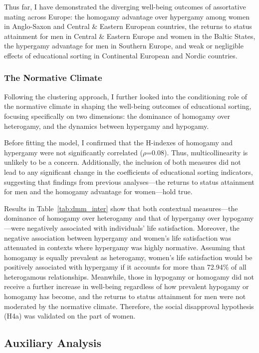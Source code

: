Thus far, I have demonstrated the diverging well-being outcomes of assortative mating across Europe: the homogamy advantage over hypergamy among women in Anglo-Saxon and Central \& Eastern European countries, the returns to status attainment for men in Central \& Eastern Europe and women in the Baltic States, the hypergamy advantage for men in Southern Europe, and weak or negligible effects of educational sorting in Continental European and Nordic countries.

\subsubsection{The Normative Climate}

Following the clustering approach, I further looked into the conditioning role of the normative climate in shaping the well-being outcomes of educational sorting, focusing specifically on two dimensions: the dominance of homogamy over heterogamy, and the dynamics between hypergamy and hypogamy.

Before fitting the model, I confirmed that the H-indexes of homogamy and hypergamy were not significantly correlated ($\rho$=0.08). Thus, multicollinearity is unlikely to be a concern. Additionally, the inclusion of both measures did not lead to any significant change in the coefficients of educational sorting indicators, suggesting that findings from previous analyses—the returns to status attainment for men and the homogamy advantage for women—hold true.

Results in Table~\ref{tab:dmm_inter} show that both contextual measures—the dominance of homogamy over heterogamy and that of hypergamy over hypogamy—were negatively associated with individuals' life satisfaction. Moreover, the negative association between hypergamy and women's life satisfaction was attenuated in contexts where hypergamy was highly normative. Assuming that homogamy is equally prevalent as heterogamy, women's life satisfaction would be positively associated with hypergamy if it accounts for more than 72.94\% of all heterogamous relationships. Meanwhile, those in hypogamy or homogamy did not receive a further increase in well-being regardless of how prevalent hypogamy or homogamy has become, and the returns to status attainment for men were not moderated by the normative climate. Therefore, the social disapproval hypothesis (H4a) was validated on the part of women.

\subsection{Auxiliary Analysis}

